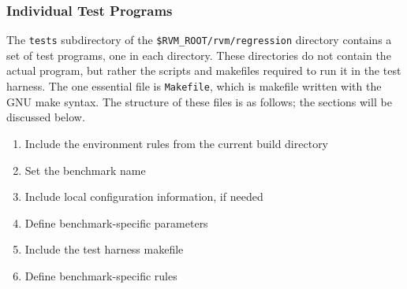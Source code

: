 \subsubsection{Individual Test Programs}

 The {\tt tests} subdirectory of the {\tt{\$RVM\_ROOT/rvm/regression}}
directory contains a set of test programs, one in each directory.
These directories do not contain the actual program, but rather the
scripts and makefiles required to run it in the test harness.  The one
essential file is {\tt{Makefile}}, which is makefile written with the
GNU make syntax.  The structure of these files is as follows; the
sections will be discussed below.  
\begin{enumerate}
\item Include the environment rules from the current build directory
\item Set the benchmark name
\item Include local configuration information, if needed
\item Define benchmark-specific parameters
\item Include the test harness makefile
\item Define benchmark-specific rules
\end{enumerate}

